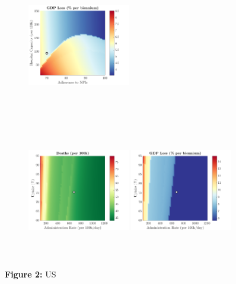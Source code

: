 \documentclass[paper=a4, fontsize=11pt]{scrartcl}
\numberwithin{figure}{section}
\numberwithin{table}{section}
\begin{document}
\begin{figure}[H]
\begin{subfigure}[b]{\textwidth}
	\hspace{0.05cm}
    	\includegraphics[width=0.49\textwidth,height=6cm]{US/SARS/npl_g}
    \end{subfigure}
    \begin{subfigure}[b]{\textwidth}
      	\includegraphics[width=0.49\textwidth,height=6cm]{US/SARS/imm_d}
	\hspace{0.05cm}
    	\includegraphics[width=0.49\textwidth,height=6cm]{US/SARS/imm_g}
    \end{subfigure}
\caption*{\textbf{Figure 2:} US} 
\end{figure}
\end{document}
